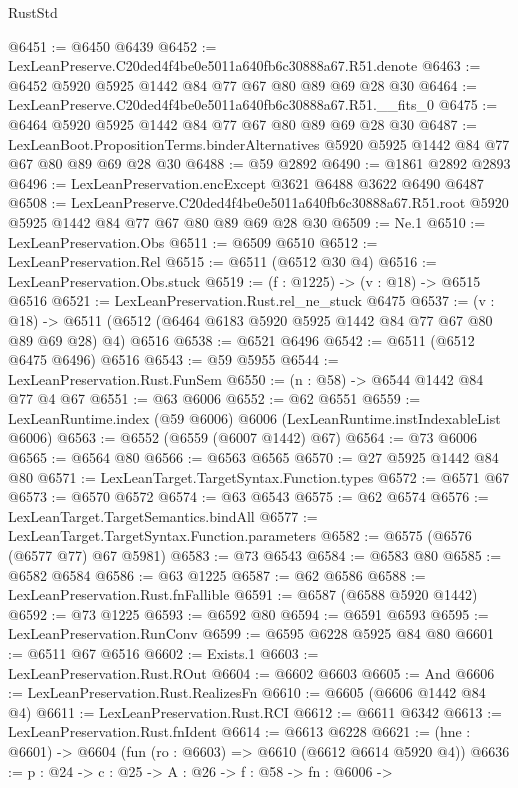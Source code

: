 \begin{lexlean}{RustStd}
\begin{coremodule}
@6451 := @6450 @6439
@6452 := LexLeanPreserve.C20ded4f4be0e5011a640fb6c30888a67.R51.denote
@6463 := @6452 @5920 @5925 @1442 @84 @77 @67 @80 @89 @69 @28 @30
@6464 := LexLeanPreserve.C20ded4f4be0e5011a640fb6c30888a67.R51.__fits_0
@6475 := @6464 @5920 @5925 @1442 @84 @77 @67 @80 @89 @69 @28 @30
@6487 := LexLeanBoot.PropositionTerms.binderAlternatives
    @5920
    @5925
    @1442
    @84
    @77
    @67
    @80
    @89
    @69
    @28
    @30
@6488 := @59 @2892
@6490 := @1861 @2892 @2893
@6496 := LexLeanPreservation.encExcept @3621 @6488 @3622 @6490 @6487
@6508 := LexLeanPreserve.C20ded4f4be0e5011a640fb6c30888a67.R51.root
    @5920
    @5925
    @1442
    @84
    @77
    @67
    @80
    @89
    @69
    @28
    @30
@6509 := Ne.{1}
@6510 := LexLeanPreservation.Obs
@6511 := @6509 @6510
@6512 := LexLeanPreservation.Rel
@6515 := @6511 (@6512 @30 @4)
@6516 := LexLeanPreservation.Obs.stuck
@6519 := (f : @1225) -> (v : @18) -> @6515 @6516
@6521 := LexLeanPreservation.Rust.rel_ne_stuck @6475
@6537 := (v : @18) ->
  @6511 (@6512 (@6464 @6183 @5920 @5925 @1442 @84 @77 @67 @80 @89 @69 @28) @4) @6516
@6538 := @6521 @6496
@6542 := @6511 (@6512 @6475 @6496) @6516
@6543 := @59 @5955
@6544 := LexLeanPreservation.Rust.FunSem
@6550 := (n : @58) -> @6544 @1442 @84 @77 @4 @67
@6551 := @63 @6006
@6552 := @62 @6551
@6559 := LexLeanRuntime.index (@59 @6006) @6006 (LexLeanRuntime.instIndexableList @6006)
@6563 := @6552 (@6559 (@6007 @1442) @67)
@6564 := @73 @6006
@6565 := @6564 @80
@6566 := @6563 @6565
@6570 := @27 @5925 @1442 @84 @80
@6571 := LexLeanTarget.TargetSyntax.Function.types
@6572 := @6571 @67
@6573 := @6570 @6572
@6574 := @63 @6543
@6575 := @62 @6574
@6576 := LexLeanTarget.TargetSemantics.bindAll
@6577 := LexLeanTarget.TargetSyntax.Function.parameters
@6582 := @6575 (@6576 (@6577 @77) @67 @5981)
@6583 := @73 @6543
@6584 := @6583 @80
@6585 := @6582 @6584
@6586 := @63 @1225
@6587 := @62 @6586
@6588 := LexLeanPreservation.Rust.fnFallible
@6591 := @6587 (@6588 @5920 @1442)
@6592 := @73 @1225
@6593 := @6592 @80
@6594 := @6591 @6593
@6595 := LexLeanPreservation.RunConv
@6599 := @6595 @6228 @5925 @84 @80
@6601 := @6511 @67 @6516
@6602 := Exists.{1}
@6603 := LexLeanPreservation.Rust.ROut
@6604 := @6602 @6603
@6605 := And
@6606 := LexLeanPreservation.Rust.RealizesFn
@6610 := @6605 (@6606 @1442 @84 @4)
@6611 := LexLeanPreservation.Rust.RCI
@6612 := @6611 @6342
@6613 := LexLeanPreservation.Rust.fnIdent
@6614 := @6613 @6228
@6621 := (hne : @6601) -> @6604 (fun (ro : @6603) => @6610 (@6612 @6614 @5920 @4))
@6636 := {p : @24} ->
  {c : @25} ->
  {A : @26} ->
  {f : @58} ->
  {fn : @6006} ->

\end{coremodule}
\end{lexlean}
